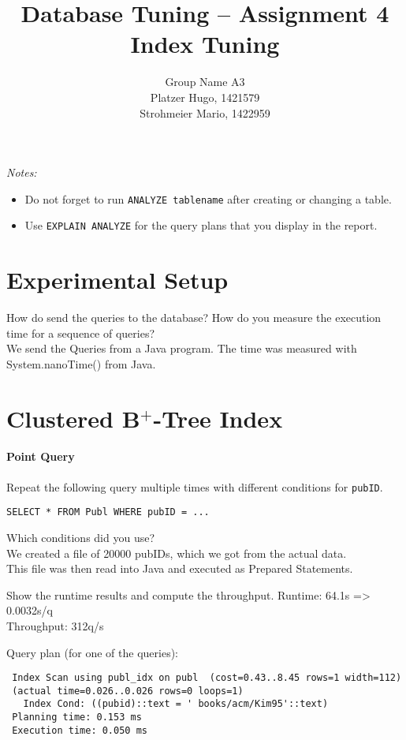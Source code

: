 \documentclass[11pt]{scrartcl}
\title{
  \textbf{\large Database Tuning -- Assignment 4}\\
  Index Tuning
}
\author{
 Group Name A3\\
 \large Platzer Hugo, 1421579 \\
 \large Strohmeier Mario, 1422959 \\
}
\begin{document}
\maketitle

\noindent
{\it Notes:}
\begin{itemize}\itemsep=0pt
\item Do not forget to run {\tt ANALYZE tablename} after creating or
  changing a table.
\item Use {\tt EXPLAIN ANALYZE} for the query plans that you display in the report.
\end{itemize}


\section{Experimental Setup}

How do send the queries to the database? How do you measure the
execution time for a sequence of queries?\\
We send the Queries from a Java program. The time was measured with System.nanoTime() from Java.

\section{Clustered B$^+$-Tree Index}

\paragraph{Point Query}

Repeat the following query multiple times with different conditions for {\tt pubID}.

{\small
\begin{verbatim}
SELECT * FROM Publ WHERE pubID = ...
\end{verbatim}
}

\noindent
Which conditions did you use?\\
We created a file of 20000 pubIDs, which we got from the actual data.\\
This file was then read into Java and executed as Prepared Statements.

\smallskip\noindent
Show the runtime results and compute the throughput.
Runtime: 64.1s => 0.0032s/q\\
Throughput: 312q/s

\smallskip\noindent
Query plan (for one of the queries):
{\small
\begin{verbatim}
 Index Scan using publ_idx on publ  (cost=0.43..8.45 rows=1 width=112)
 (actual time=0.026..0.026 rows=0 loops=1)
   Index Cond: ((pubid)::text = ' books/acm/Kim95'::text)
 Planning time: 0.153 ms
 Execution time: 0.050 ms
\end{verbatim}
}
\end{document}
